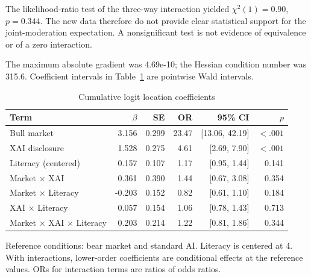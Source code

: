 \documentclass[11pt,a4paper]{article}
\begin{document}
The likelihood-ratio test of the three-way interaction yielded $\chi^2(1)=0.90$, $p=0.344$. The new data therefore do not provide clear statistical support for the joint-moderation expectation. A nonsignificant test is not evidence of equivalence or of a zero interaction.

The maximum absolute gradient was 4.69e-10; the Hessian condition number was 315.6. Coefficient intervals in Table~\ref{tab:coefficients} are pointwise Wald intervals.

\begin{table}[htbp]
\centering
\small
\caption{Cumulative logit location coefficients\label{tab:coefficients}}
\begin{tabular}{lrrrrr}
\toprule
Term & $\beta$ & SE & OR & 95\% CI & $p$\\
\midrule
Bull market & 3.156 & 0.299 & 23.47 & [13.06, 42.19] & $<.001$\\
XAI disclosure & 1.528 & 0.275 & 4.61 & [2.69, 7.90] & $<.001$\\
Literacy (centered) & 0.157 & 0.107 & 1.17 & [0.95, 1.44] & 0.141\\
Market $\times$ XAI & 0.361 & 0.390 & 1.44 & [0.67, 3.08] & 0.354\\
Market $\times$ Literacy & -0.203 & 0.152 & 0.82 & [0.61, 1.10] & 0.184\\
XAI $\times$ Literacy & 0.057 & 0.154 & 1.06 & [0.78, 1.43] & 0.713\\
Market $\times$ XAI $\times$ Literacy & 0.203 & 0.214 & 1.22 & [0.81, 1.86] & 0.344\\
\bottomrule
\end{tabular}
\par\smallskip
\begin{minipage}{.96\linewidth}\footnotesize Reference conditions: bear market and standard AI. Literacy is centered at 4. With interactions, lower-order coefficients are conditional effects at the reference values. ORs for interaction terms are ratios of odds ratios.\end{minipage}
\end{table}
\end{document}
